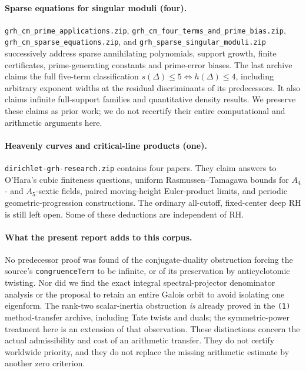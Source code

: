 \paragraph{Sparse equations for singular moduli (four).}
\nolinkurl{grh_cm_prime_applications.zip},
\nolinkurl{grh_cm_four_terms_and_prime_bias.zip},
\nolinkurl{grh_cm_sparse_equations.zip}, and
\nolinkurl{grh_sparse_singular_moduli.zip}
successively address sparse annihilating polynomials, support growth,
finite certificates, prime-generating constants and prime-error biases.
The last archive claims the full five-term classification
$s(\Delta)\le5\iff h(\Delta)\le4$, including arbitrary exponent widths
at the residual discriminants of its predecessors. It also claims
infinite full-support families and quantitative density results.
We preserve these claims as prior work; we do not recertify their entire
computational and arithmetic arguments here.

\paragraph{Heavenly curves and critical-line products (one).}
\nolinkurl{dirichlet-grh-research.zip} contains four papers. They claim
answers to O'Hara's cubic finiteness questions, uniform
Rasmussen--Tamagawa bounds for $A_4$- and $A_5$-sextic fields, paired
moving-height Euler-product limits, and periodic geometric-progression
constructions. The ordinary all-cutoff, fixed-center deep RH is still
left open. Some of these deductions are independent of RH.

\paragraph{What the present report adds to this corpus.}
No predecessor proof was found of the conjugate-duality obstruction
forcing the source's \texttt{congruenceTerm} to be infinite, or of its
preservation by anticyclotomic twisting. Nor did we find the exact integral
spectral-projector denominator analysis or the proposal to retain an
entire Galois orbit to avoid isolating one eigenform. The rank-two
scalar-inertia obstruction \emph{is} already proved in the
\texttt{(1)} method-transfer archive, including Tate twists and duals;
the symmetric-power treatment here is an extension of that observation.
These distinctions concern the actual admissibility and cost of an
arithmetic transfer. They do not certify worldwide priority, and they
do not replace the missing arithmetic estimate by another zero criterion.
